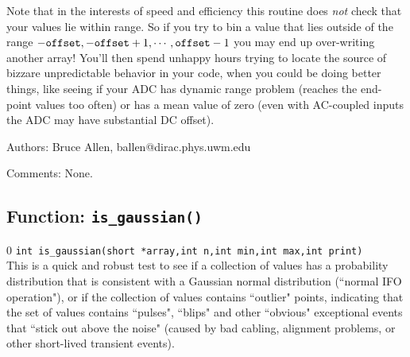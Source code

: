 Note that in the interests of speed and efficiency this routine does
{\it not} check that your values lie within range.  So if you try to
bin a value that lies outside of the range $-{\tt offset}, -{\tt
offset}+1,\cdots,{\tt offset}-1$ you may end up over-writing another
array!  You'll then spend unhappy hours trying to locate the source of
bizzare unpredictable behavior in your code, when you could be doing
better things, like seeing if your ADC has dynamic range problem
(reaches the end-point values too often) or has a mean value of zero
(even with AC-coupled inputs the ADC may have substantial DC offset).
\begin{description}
\item{Authors:}
Bruce Allen, ballen@dirac.phys.uwm.edu
\item{Comments:}
None.
\end{description}
\clearpage




\subsection{Function: {\tt is\_gaussian()}}
\label{subsec:is_gaussian}
\setcounter{equation}0
{\tt  int is\_gaussian(short *array,int n,int min,int max,int print) }\\
This is a quick and robust test to see if a collection of values has a
probability distribution that is consistent with a Gaussian normal
distribution (``normal IFO operation"), or if the collection of values
contains ``outlier" points, indicating that the set of values contains
``pulses", ``blips" and other ``obvious" exceptional events that
``stick out above the noise" (caused by bad cabling, alignment
problems, or other short-lived transient events).

